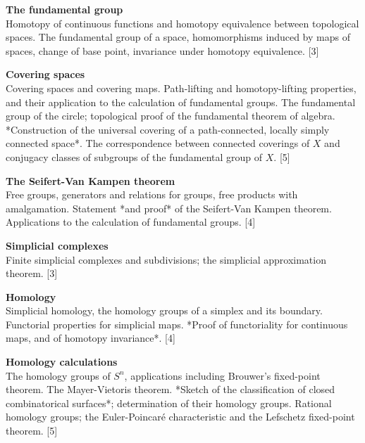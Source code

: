 \documentclass[a4paper]{article}
\begin{document}
\maketitle
{\small
\noindent\textbf{The fundamental group}\\
Homotopy of continuous functions and homotopy equivalence between topological spaces. The fundamental group of a space, homomorphisms induced by maps of spaces, change of base point, invariance under homotopy equivalence.\hspace*{\fill} [3]

\vspace{10pt}
\noindent\textbf{Covering spaces}\\
Covering spaces and covering maps. Path-lifting and homotopy-lifting properties, and their application to the calculation of fundamental groups. The fundamental group of the circle; topological proof of the fundamental theorem of algebra. *Construction of the universal covering of a path-connected, locally simply connected space*. The correspondence between connected coverings of $X$ and conjugacy classes of subgroups of the fundamental group of $X$.\hspace*{\fill} [5]

\vspace{10pt}
\noindent\textbf{The Seifert-Van Kampen theorem}\\
Free groups, generators and relations for groups, free products with amalgamation. Statement *and proof* of the Seifert-Van Kampen theorem. Applications to the calculation of fundamental groups.\hspace*{\fill} [4]

\vspace{10pt}
\noindent\textbf{Simplicial complexes}\\
Finite simplicial complexes and subdivisions; the simplicial approximation theorem.\hspace*{\fill} [3]

\vspace{10pt}
\noindent\textbf{Homology}\\
Simplicial homology, the homology groups of a simplex and its boundary. Functorial properties for simplicial maps. *Proof of functoriality for continuous maps, and of homotopy invariance*.\hspace*{\fill} [4]

\vspace{10pt}
\noindent\textbf{Homology calculations}\\
The homology groups of $S^n$, applications including Brouwer's fixed-point theorem. The Mayer-Vietoris theorem. *Sketch of the classification of closed combinatorical surfaces*; determination of their homology groups. Rational homology groups; the Euler-Poincar\'e characteristic and the Lefschetz fixed-point theorem.\hspace*{\fill} [5]}
\end{document}
